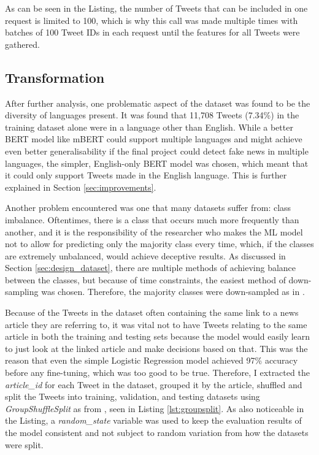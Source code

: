 \documentclass{l4proj}
\begin{document}
As can be seen in the Listing, the number of Tweets that can be included in one request is limited to 100, which is why this call was made multiple times with batches of 100 Tweet IDs in each request until the features for all Tweets were gathered.

\subsection{Transformation}

After further analysis, one problematic aspect of the dataset was found to be the diversity of languages present. It was found that 11,708 Tweets (7.34\%) in the training dataset alone were in a language other than English. While a better BERT model like mBERT could support multiple languages and might achieve even better generalisability if the final project could detect fake news in multiple languages, the simpler, English-only BERT model was chosen, which meant that it could only support Tweets made in the English language. This is further explained in Section \ref{sec:improvements}.

Another problem encountered was one that many datasets suffer from: class imbalance. Oftentimes, there is a class that occurs much more frequently than another, and it is the responsibility of the researcher who makes the ML model not to allow for predicting only the majority class every time, which, if the classes are extremely unbalanced, would achieve deceptive results. As discussed in Section \ref{sec:design_dataset}, there are multiple methods of achieving balance between the classes, but because of time constraints, the easiest method of down-sampling was chosen. Therefore, the majority classes were down-sampled as in \citet{ClassImbalance}. 

Because of the Tweets in the dataset often containing the same link to a news article they are referring to, it was vital not to have Tweets relating to the same article in both the training and testing sets because the model would easily learn to just look at the linked article and make decisions based on that. This was the reason that even the simple Logistic Regression model achieved 97\% accuracy before any fine-tuning, which was too good to be true. Therefore, I extracted the \textit{article\_id} for each Tweet in the dataset, grouped it by the article, shuffled and split the Tweets into training, validation, and testing datasets using \textit{GroupShuffleSplit} as from \citet{GroupSplit}, seen in Listing \ref{lst:groupsplit}. As also noticeable in the Listing, a \textit{random\_state} variable was used to keep the evaluation results of the model consistent and not subject to random variation from how the datasets were split.
\end{document}
